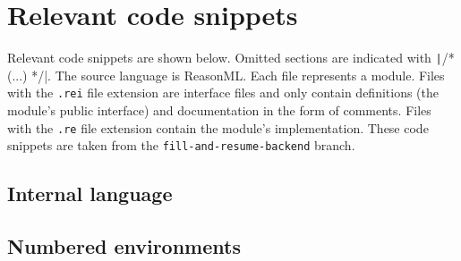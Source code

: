 \begin{table}
  \centering
  \caption{Correspondence between algorithms and code}
  \label{tab:correspondence-algos-code}
\end{table}

\section{Relevant code snippets}
\label{sec:relevant-code}

Relevant code snippets are shown below. Omitted sections are indicated with \texttt|/* (...) */|. The source language is ReasonML. Each file represents a module. Files with the \texttt{.rei} file extension are interface files and only contain definitions (the module's public interface) and documentation in the form of comments. Files with the \texttt{.re} file extension contain the module's implementation. These code snippets are taken from the \texttt{fill-and-resume-backend} branch.

\subsection{Internal language}
\label{sec:code-internal-language}



\subsection{Numbered environments}
\label{sec:code-evalenv}



